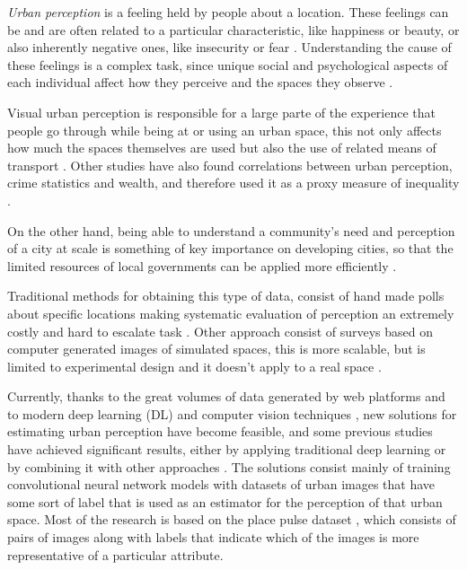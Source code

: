\textit{Urban perception} is a feeling held by people about a location. These feelings can be and
are often related to a particular characteristic, like happiness or beauty, or also
inherently negative ones, like insecurity or fear \cite{tamara_judgments}. Understanding the
cause of these feelings is a complex task, since unique social and psychological aspects
of each individual affect how they perceive and the spaces they observe \cite{nasar_perception}.

Visual urban perception is  responsible for a large parte of the experience that people
go through while  being at or using an urban space, this not only affects how much the spaces
themselves are used \cite{khisty} but also the use of related means of transport \cite{antonakos}.
Other studies have also found correlations between urban perception, crime statistics \cite{tamara_judgments}
and wealth, and therefore used it as a proxy measure of inequality \cite{tamara_judgments,hidalgo_inequality, rossetti}.

On the other hand, being able to understand a community's need and perception of a city at scale is something
of key importance on developing cities, so that the limited  resources of local governments can be applied
more efficiently \cite{santani}.

Traditional methods for obtaining this type of data, consist of hand made polls
about specific locations making systematic evaluation of perception  an extremely costly and hard
to escalate task \cite{nasar_perception,clifton}. Other approach consist of surveys based on
computer generated images of simulated spaces, this is more scalable, but is limited to experimental
design and it doesn't apply to a real space \cite{lain_grenspace,iglesias_perception}.

Currently, thanks to the great volumes of data generated by web platforms \cite{hidalgo_inequality}
and to modern deep learning (DL) and computer vision techniques \cite{lecun_dl}, new solutions for
estimating urban perception have become feasible, and some previous studies have achieved
significant results, either by applying traditional deep learning \cite{hidalgo_placepulse}
or by combining it with other approaches \cite{rossetti, zhang_measuring}. The solutions consist
mainly of training convolutional neural network models \cite{lecun_mnist} with datasets
of urban images that have some sort of label that is used as an estimator for the perception
of that urban space. Most of the research is based on the place pulse dataset \cite{hidalgo_placepulse}, which
consists of pairs of images along with labels that indicate which of the images is more representative of a
particular attribute.

